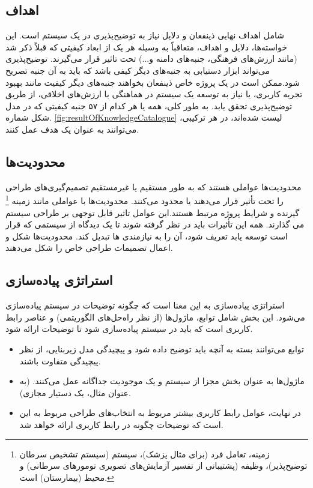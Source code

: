 \subsection{اهداف}

شامل اهداف نهایی ذینفعان و دلایل نیاز به توضیح‌پذیری در یک سیستم است. این
خواسته‌ها، دلایل و اهداف، متعاقباً به وسیله هر یک از ابعاد کیفیتی که قبلاً ذکر
شد (مانند ارزش‌های فرهنگی، جنبه‌های دامنه و...) تحت تاثیر قرار می‌گیرند.
توضیح‌پذیری می‌تواند ابزار دستیابی به جنبه‌های دیگر کیفی باشد که باید به آن جنبه
تصریح شود.ممکن است در یک پروژه خاص ذینفعان بخواهند جنبه‌های دیگر کیفیت مانند
بهبود تجربه کاربری، یا نیاز به توسعه یک سیستم در هماهنگی با ارزش‌های اخلاقی، از
طریق توضیح‌پذیری تحقق یابد. به طور کلی، همه یا هر کدام از ۵۷ جنبه کیفیتی که در
مدل شکل شماره. \ref{fig:resultOfKnowledgeCatalogue} لیست شده‌اند، در هر ترکیبی،
می‌توانند به عنوان یک هدف عمل کنند.

\subsection{محدودیت‌ها}

محدودیت‌ها عواملی هستند که به طور مستقیم یا غیرمستقیم تصمیم‌گیری‌های طراحی را
تحت تأثیر قرار می‌دهند یا محدود می‌کنند. محدودیت‌ها با عواملی مانند زمینه
\footnote{زمینه، تعامل فرد (برای مثال پزشک)، سیستم (سیستم تشخیص سرطان
توضیح‌پذیر)، وظیفه (پشتیبانی از تفسیر آزمایش‌های تصویری تومور‌های سرطانی) و محیط
(بیمارستان) است.} گیرنده و شرایط پروژه مرتبط هستند.این عوامل تاثیر قابل توجهی بر
طراحی سیستم می گذارند. همه این تأثیرات باید در نظر گرفته شوند تا یک دیدگاه از
سیستمی که قرار است توسعه یابد تعریف شود، آن را به نیازمندی ها تبدیل کند.
محدودیت‌ها شکل و اعمال تصمیمات طراحی خاص را شکل می‌دهند. 

\subsection{استراتژی پیاده‌سازی}

استراتژی پیاده‌سازی به این معنا است که چگونه توضیحات در سیستم پیاده‌سازی
می‌شود. این بخش شامل توابع، ماژول‌ها (از نظر راه‌حل‌های الگوریتمی) و عناصر رابط
کاربری است که باید در سیستم پیاده‌سازی شود تا توضیحات ارائه شود.

\begin{itemize}
    \item توابع می‌توانند بسته به آنچه باید توضیح داده شود و پیچیدگی مدل
    زیربنایی، از نظر پیچیدگی متفاوت باشند.
    \item ماژول‌ها به عنوان بخش مجزا از سیستم و یک موجودیت جداگانه عمل می‌کنند.
    (به عنوان مثال، یک دستیار مجازی). 
    \item در نهایت، عوامل رابط کاربری بیشتر مربوط به انتخاب‌های طراحی مربوط به
    این است که توضیحات چگونه در رابط کاربری ارائه خواهد شد.
\end{itemize}

